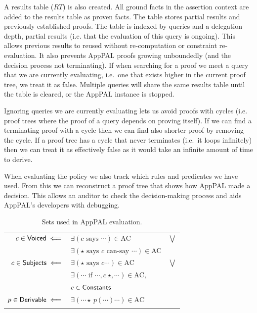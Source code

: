 \documentclass[thesis.tex]{subfiles}
\begin{document}
A results table ($RT$) is also created. All ground facts in the assertion
context are added to the results table as proven facts. The table stores
partial results and previously established proofs. The table is indexed by
queries and a delegation depth, partial results (i.e. that the evaluation of
this query is ongoing). This allows previous results to reused without
re-computation or constraint re-evaluation. It also prevents AppPAL proofs
growing unboundedly (and the decision process not terminating). If when
searching for a proof we meet a query that we are currently evaluating,
i.e.~one that exists higher in the current proof tree, we treat it as false.
Multiple queries will share the same results table until the table is cleared,
or the AppPAL instance is stopped.

Ignoring queries we are currently evaluating lets us avoid proofs with cycles
(i.e. proof trees where the proof of a query depends on proving itself).  If we
can find a terminating proof with a cycle then we can find also shorter proof
by removing the cycle.  If a proof tree has a cycle that never terminates
(i.e.~it loops infinitely) then we can treat it as effectively false as it
would take an infinite amount of time to derive.

When evaluating the policy we also track which rules and predicates we have
used. From this we can reconstruct a proof tree that shows how AppPAL made a
decision. This allows an auditor to check the decision-making process and aids
AppPAL's developers with debugging.

\begin{table}
  \centering\sffamily\small
  \newcommand{\myset}[1]{\ensuremath{\text{\sffamily #1}}}
  \begin{tabular}{r l c}
    \toprule
    $c \in \myset{Voiced} \impliedby$     & $\exists \left(c \text{~says~} \cdots\right) \in \text{AC}$                        & $\bigvee$ \\
                                          & $\exists \left(\star \text{~says~} c \text{~can-say~} \cdots\right) \in \text{AC}$ &           \\
    $c \in \myset{Subjects} \impliedby$   & $\exists \left(\star \text{~says~} c\cdots\right) \in \text{AC}$                   & $\bigvee$ \\
                                          & $\exists \left(\cdots \text{~if~} \cdots,c~\star,\cdots\right) \in \text{AC},$     &           \\
                                          & $c \in \myset{Constants}$                                                          &           \\
    $p \in \myset{Derivable} \impliedby$  & $\exists \left( \cdots \star~p\left(\cdots\right) \cdots\right) \in \text{AC}$     &           \\
    \bottomrule                          \\
  \end{tabular}
  \caption{Sets used in AppPAL evaluation.}
  \label{tab:apppal-sets}
\end{table}
\end{document}

